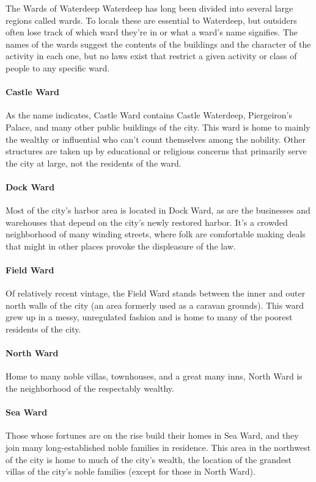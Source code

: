 \documentclass[10pt,a4paper,twoside,twocolumn,openany,bg=print,nodeprecatedcode]{dndbook}
\begin{document}
\begin{DndComment}{The Wards of Waterdeep}
Waterdeep has long been divided into several large regions called wards. To locals these are essential to Waterdeep, but outsiders often lose track of which ward they're in or what a ward's name signifies. The names of the wards suggest the contents of the buildings and the character of the activity in each one, but no laws exist that restrict a given activity or class of people to any specific ward.
\paragraph{Castle Ward}
As the name indicates, Castle Ward contains Castle Waterdeep, Piergeiron's Palace, and many other public buildings of the city. This ward is home to mainly the wealthy or influential who can't count themselves among the nobility. Other structures are taken up by educational or religious concerns that primarily serve the city at large, not the residents of the ward.
\paragraph{Dock Ward}
Most of the city's harbor area is located in Dock Ward, as are the businesses and warehouses that depend on the city's newly restored harbor. It's a crowded neighborhood of many winding streets, where folk are comfortable making deals that might in other places provoke the displeasure of the law.
\paragraph{Field Ward}
Of relatively recent vintage, the Field Ward stands between the inner and outer north walls of the city (an area formerly used as a caravan grounds). This ward grew up in a messy, unregulated fashion and is home to many of the poorest residents of the city.
\paragraph{North Ward}
Home to many noble villas, townhouses, and a great many inns, North Ward is the neighborhood of the respectably wealthy.
\paragraph{Sea Ward}
Those whose fortunes are on the rise build their homes in Sea Ward, and they join many long-established noble families in residence. This area in the northwest of the city is home to much of the city's wealth, the location of the grandest villas of the city's noble families (except for those in North Ward).

\end{DndComment}
\end{document}
